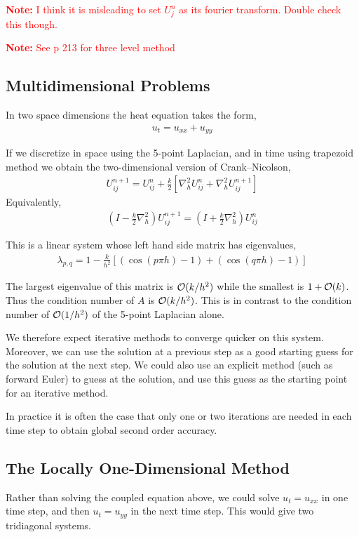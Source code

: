 \documentclass[12pt]{article}
\newcommand{\note}[1]{\textcolor{red}{\textbf{Note:} #1}}
\begin{document}
\note{I think it is misleading to set \( U_j^n \) as its fourier transform. Double check this though.}

\note{See p 213 for three level method}

\subsection{Multidimensional Problems}
In two space dimensions the heat equation takes the form,
\begin{align*}
    u_t = u_{xx} + u_{yy}
\end{align*}

If we discretize in space using the 5-point Laplacian, and in time using trapezoid method we obtain the two-dimensional version of Crank--Nicolson,
\begin{align*}
    U_{ij}^{n+1} = U_{ij}^n + \frac{k}{2} \left[ \nabla_h^2 U_{ij}^n + \nabla_h^2 U_{ij}^{n+1} \right]
\end{align*}
Equivalently,
\begin{align*}
    \left( I-\frac{k}{2} \nabla_h^2 \right) U_{ij}^{n+1} = \left( I + \frac{k}{2} \nabla_h^2 \right)U_{ij}^n
\end{align*}

This is a linear system whose left hand side matrix has eigenvalues,
\begin{align*}
    \lambda_{p,q} = 1- \frac{k}{h^2} \left[ (\cos(p\pi h)-1) + (\cos(q\pi h)-1) \right]
\end{align*}

The largest eigenvalue of this matrix is \( \mathcal{O}(k/h^2) \) while the smallest is \( 1+\mathcal{O}(k) \). Thus the condition number of \( A \) is \( \mathcal{O}(k/h^2) \). This is in contrast to the condition number of \( \mathcal{O}(1/h^2) \) of the 5-point Laplacian alone.

We therefore expect iterative methods to converge quicker on this system. Moreover, we can use the solution at a previous step as a good starting guess for the solution at the next step. We could also use an explicit method (such as forward Euler) to guess at the solution, and use this guess as the starting point for an iterative method.

In practice it is often the case that only one or two iterations are needed in each time step to obtain global second order accuracy.

\subsection{The Locally One-Dimensional Method}
Rather than solving the coupled equation above, we could solve \( u_t = u_{xx} \) in one time step, and then \( u_t = u_{yy} \) in the next time step. This would give two tridiagonal systems. 
\end{document}
